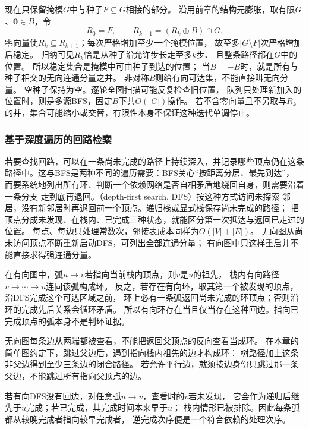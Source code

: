 现在只保留掩模$G$中与种子$F\subseteq G$相接的部分。
沿用前章的结构元膨胀，取有限$G$、$\bm0\in B$，令
\begin{equation}
 R_0=F,\qquad R_{k+1}=(R_k\oplus B)\cap G.
 \label{eq:graph-mask-reconstruction}
\end{equation}
零向量使$R_k\subseteq R_{k+1}$；每次严格增加至少一个掩模位置，
故至多$|G\setminus F|$次严格增加后稳定。
归纳可见$R_k$恰是从种子沿允许步长走至多$k$步、
且整条路径都在$G$中的位置。
所以稳定集合是掩模中可由种子到达的位置；
当$B=-B$时，就是所有与种子相交的无向连通分量之并。
非对称$B$则给有向可达集，不能直接叫无向分量。
空种子保持为空。逐轮全图扫描可能反复检查旧位置，
队列只处理新加入的位置时，则是多源BFS，固定$B$下共$O(|G|)$操作。
若不含零向量且不另取与$R_k$的并，集合可能缩小或交替，有限性本身不保证这种迭代单调停止。

\subsubsection{基于深度遍历的回路检索}
\label{sec:graph-theory-dfs}

若要查找回路，可以在一条尚未完成的路径上持续深入，并记录哪些顶点仍在这条
路径中。这与BFS是两种不同的遍历需要：BFS关心“按距离分层、最先到达”，
而要系统地列出所有环、判断一个依赖网络是否自相矛盾地绕回自身，则需要沿着一条分支
走到底再退回。（depth-first search, DFS）按这种方式访问未探索
邻居，没有新邻居时再退回前一个顶点。递归栈或显式栈保存尚未完成的路径；
把顶点分成未发现、在栈内、已完成三种状态，就能区分第一次抵达与返回已走过的位置。
每点、每边只处理常数次，邻接表成本同样为\(O(|V|+|E|)\)。
无向图从尚未访问顶点不断重新启动DFS，可列出全部连通分量；
有向图中只这样重启并不能直接求得强连通分量。

在有向图中，弧\(u\to v\)若指向当前栈内顶点，则\(v\)是\(u\)的祖先，
栈内有向路径\(v\to\cdots\to u\)连同该弧构成环。
反之，若存在有向环，取其第一个被发现的顶点，沿DFS完成这个可达区域之前，
环上必有一条弧返回尚未完成的环顶点；否则沿环的完成先后关系会循环矛盾。
所以有向环存在当且仅当存在这种回边。指向已完成顶点的弧本身不是判环证据。

无向图每条边从两端都被查看，不能把返回父顶点的反向查看当成环。
在本章的简单图约定下，跳过父边后，遇到指向栈内祖先的边才构成环：
树路径加上这条非父边得到至少三条边的闭合路径。
若允许平行边，就须按边身份只跳过那一条父边，不能跳过所有指向父顶点的边。

若有向DFS没有回边，对任意弧\(u\to v\)，查看时的\(v\)若未发现，
它会作为递归后继先于\(u\)完成；若已完成，其完成时间本来早于\(u\)；
栈内情形已被排除。因此每条弧都从较晚完成者指向较早完成者，
逆完成次序便是一个符合依赖的处理次序。

